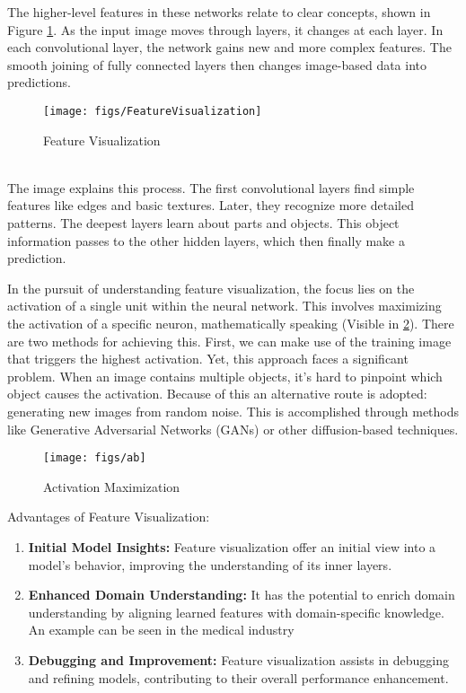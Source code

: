 The higher-level features in these networks relate to clear concepts, shown in Figure \ref{fig:feature-visualization}. As the input image moves through layers, it changes at each layer. In each convolutional layer, the network gains new and more complex features. The smooth joining of fully connected layers then changes image-based data into predictions.
\\
\begin{figure}[h!]
	\centering
	\texttt{[image: figs/FeatureVisualization]}
	\caption{Feature Visualization \cite{olah2017feature}}
	\label{fig:feature-visualization}
\end{figure}
\\
The image explains this process. The first convolutional layers find simple features like edges and basic textures. Later, they recognize more detailed patterns. The deepest layers learn about parts and objects. This object information passes to the other hidden layers, which then finally make a prediction.

In the pursuit of understanding feature visualization, the focus lies on the activation of a single unit within the neural network. This involves maximizing the activation of a specific neuron, mathematically speaking (Visible in \ref*{fig:optimization}). There are two methods for achieving this. First, we can make use of the training image that triggers the highest activation. Yet, this approach faces a significant problem. When an image contains multiple objects, it's hard to pinpoint which object causes the activation. Because of this an alternative route is adopted: generating new images from random noise. This is accomplished through methods like Generative Adversarial Networks (GANs) or other diffusion-based techniques.

\begin{figure}[h!]
	\centering
	\texttt{[image: figs/ab]}
	\caption{Activation Maximization \cite{olah2017feature}}
	\label{fig:optimization}
\end{figure}

Advantages of Feature Visualization:
\begin{enumerate}
	\item \textbf{Initial Model Insights:} Feature visualization offer an initial view into a model's behavior, improving the understanding of its inner layers.
	\item \textbf{Enhanced Domain Understanding:} It has the potential to enrich domain understanding by aligning learned features with domain-specific knowledge. An example can be seen in the medical industry
	\item \textbf{Debugging and Improvement:} Feature visualization assists in debugging and refining models, contributing to their overall performance enhancement.
\end{enumerate}

